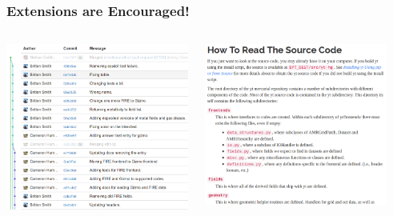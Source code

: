 \documentclass[]{beamer}
\begin{document}
\begin{frame}
  \frametitle{Extensions are Encouraged!}
  \begin{columns}
    \column{6cm}
    \begin{center}
      \includegraphics[width=6cm]{figures/yt-pull-requests.png}
    \end{center}
    \column{6cm}
    \begin{center}
      \includegraphics[width=6cm]{figures/yt-development-docs.png}
    \end{center}
  \end{columns}
\end{frame}
\end{document}
